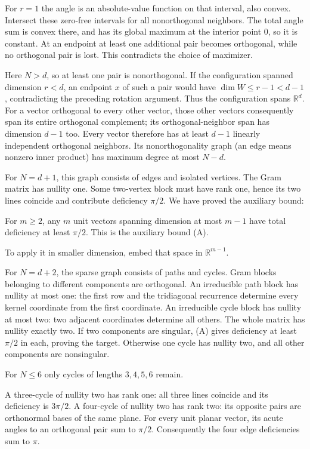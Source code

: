 \documentclass[11pt,a4paper]{article}
\begin{document}
For \(r=1\) the angle is an absolute-value function on that interval, also convex. Intersect these zero-free intervals for all nonorthogonal neighbors. The total angle sum is convex there, and has its global maximum at the interior point \(0\), so it is constant. At an endpoint at least one additional pair becomes orthogonal, while no orthogonal pair is lost. This contradicts the choice of maximizer.

Here \(N>d\), so at least one pair is nonorthogonal. If the configuration spanned dimension \(r<d\), an endpoint \(x\) of such a pair would have \(\dim W\le r-1<d-1\), contradicting the preceding rotation argument. Thus the configuration spans \(\mathbb R^d\). For a vector orthogonal to every other vector, those other vectors consequently span its entire orthogonal complement; its orthogonal-neighbor span has dimension \(d-1\) too. Every vector therefore has at least \(d-1\) linearly independent orthogonal neighbors. Its nonorthogonality graph (an edge means nonzero inner product) has maximum degree at most \(N-d\).

For \(N=d+1\), this graph consists of edges and isolated vertices. The Gram matrix has nullity one. Some two-vertex block must have rank one, hence its two lines coincide and contribute deficiency \(\pi/2\). We have proved the auxiliary bound:

For \(m\ge2\), any \(m\) unit vectors spanning dimension at most \(m-1\) have total deficiency at least \(\pi/2\). This is the auxiliary bound (A).

To apply it in smaller dimension, embed that space in \(\mathbb R^{m-1}\).

For \(N=d+2\), the sparse graph consists of paths and cycles. Gram blocks belonging to different components are orthogonal. An irreducible path block has nullity at most one: the first row and the tridiagonal recurrence determine every kernel coordinate from the first coordinate. An irreducible cycle block has nullity at most two: two adjacent coordinates determine all others. The whole matrix has nullity exactly two. If two components are singular, (A) gives deficiency at least \(\pi/2\) in each, proving the target. Otherwise one cycle has nullity two, and all other components are nonsingular.

For \(N\le6\) only cycles of lengths \(3,4,5,6\) remain.

A three-cycle of nullity two has rank one: all three lines coincide and its deficiency is \(3\pi/2\). A four-cycle of nullity two has rank two: its opposite pairs are orthonormal bases of the same plane. For every unit planar vector, its acute angles to an orthogonal pair sum to \(\pi/2\). Consequently the four edge deficiencies sum to \(\pi\).
\end{document}
